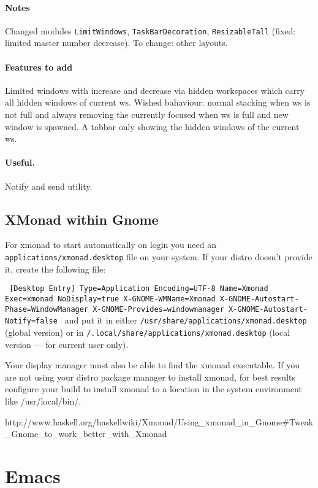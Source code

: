 \documentclass{article}
\begin{document}
\paragraph{Notes}
Changed modules \texttt{LimitWindows}, \texttt{TaskBarDecoration}, \texttt{ResizableTall} (fixed: limited master number decrease).
To change: other layouts.

\paragraph{Features to add}
Limited windows with increase and decrease via hidden workspaces which carry all hidden windows of current ws. Wished bahaviour: normal stacking when ws is not full and always removing the currently focused when ws is full and new window is spawned.
A tabbar only showing the hidden windows of the current ws.

\paragraph{Useful.} Notify and send utility.

\subsection{XMonad within Gnome}

For xmonad to start automatically on login you need an {\tt applications/xmonad.desktop} file on your system. If your distro doesn't provide it, create the following file:

{\tt
[Desktop Entry]
Type=Application
Encoding=UTF-8
Name=Xmonad
Exec=xmonad
NoDisplay=true
X-GNOME-WMName=Xmonad
X-GNOME-Autostart-Phase=WindowManager
X-GNOME-Provides=windowmanager
X-GNOME-Autostart-Notify=false
}
and put it in either {\tt /usr/share/applications/xmonad.desktop} (global version) or in {\tt /.local/share/applications/xmonad.desktop} (local version --- for current user only).

Your display manager must also be able to find the xmonad executable. If you are not using your distro package manager to install xmonad, for best results configure your build to install xmonad to a location in the system environment like /usr/local/bin/.

http://www.haskell.org/haskellwiki/Xmonad/Using_xmonad_in_Gnome#Tweak_Gnome_to_work_better_with_Xmonad

\section{Emacs}
\end{document}
